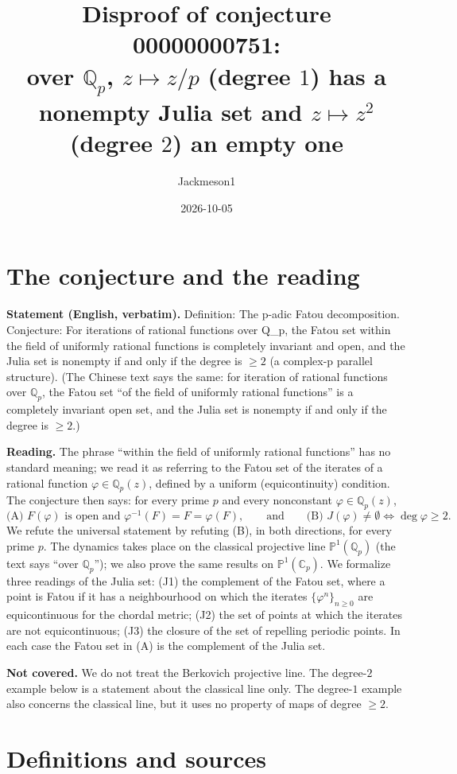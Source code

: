 \documentclass[11pt]{article}
\title{Disproof of conjecture 00000000751:\\ over $\mathbb{Q}_p$, $z\mapsto z/p$ (degree $1$) has a nonempty Julia set and $z\mapsto z^2$ (degree $2$) an empty one}
\author{Jackmeson1}
\date{2026-10-05}
\theoremstyle{definition}
\newcommand{\Qp}{\mathbb{Q}_p}
\newcommand{\Cp}{\mathbb{C}_p}
\newcommand{\PP}{\mathbb{P}^1}
\begin{document}
\maketitle

\section{The conjecture and the reading}

\textbf{Statement (English, verbatim).} Definition: The p-adic Fatou decomposition. Conjecture:
For iterations of rational functions over Q\_p, the Fatou set within the field of uniformly
rational functions is completely invariant and open, and the Julia set is nonempty if and only if
the degree is $\ge 2$ (a complex-p parallel structure). (The Chinese text says the same: for
iteration of rational functions over $\Qp$, the Fatou set ``of the field of uniformly rational
functions'' is a completely invariant open set, and the Julia set is nonempty if and only if the
degree is $\ge 2$.)

\textbf{Reading.} The phrase ``within the field of uniformly rational functions'' has no standard
meaning; we read it as referring to the Fatou set of the iterates of a rational function
$\varphi\in\Qp(z)$, defined by a uniform (equicontinuity) condition. The conjecture then says: for
every prime $p$ and every nonconstant $\varphi\in\Qp(z)$,
\[
 \text{(A) } F(\varphi) \text{ is open and } \varphi^{-1}(F)=F=\varphi(F),
 \qquad\text{and}\qquad
 \text{(B) } J(\varphi)\neq\emptyset \iff \deg\varphi\ge 2 .
\]
We refute the universal statement by refuting (B), in both directions, for every prime $p$. The
dynamics takes place on the classical projective line $\PP(\Qp)$ (the text says ``over $\Qp$''); we
also prove the same results on $\PP(\Cp)$. We formalize three readings of the Julia set:
(J1) the complement of the Fatou set, where a point is Fatou if it has a neighbourhood on which the
iterates $\{\varphi^{n}\}_{n\ge0}$ are equicontinuous for the chordal metric; (J2) the set of points
at which the iterates are not equicontinuous; (J3) the closure of the set of repelling periodic
points. In each case the Fatou set in (A) is the complement of the Julia set.

\textbf{Not covered.} We do not treat the Berkovich projective line. The degree-$2$ example below
is a statement about the classical line only. The degree-$1$ example also concerns the classical
line, but it uses no property of maps of degree $\ge 2$.

\section{Definitions and sources}
\end{document}
